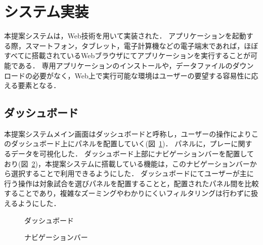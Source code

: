 \documentclass[sotsuron]{kuee}
\begin{document}
	\section{システム実装}
			本提案システムは，Web技術を用いて実装された．
			アプリケーションを起動する際，スマートフォン，タブレット，電子計算機などの電子端末であれば，ほぼすべてに搭載されているWebブラウザにてアプリケーションを実行することが可能である．
			専用アプリケーションのインストールや，データファイルのダウンロードの必要がなく，Web上で実行可能な環境はユーザーの要望する容易性に応える要素となる．
		\subsection{ダッシュボード}
			本提案システムメイン画面はダッシュボードと呼称し，ユーザーの操作によりこのダッシュボード上にパネルを配置していく(図~\ref{fig:dashboard})．
			パネルに，プレーに関するデータを可視化した．
			ダッシュボード上部にナビゲーションバーを配置しており(図~\ref{fig:nav})，本提案システムに搭載している機能は，このナビゲーションバーから選択することで利用できるようにした．
			ダッシュボードにてユーザーが主に行う操作は対象試合を選びパネルを配置することと，配置されたパネル間を比較することであり，複雑なズーミングやわかりにくいフィルタリングは行わずに扱えるようにした．
			\begin{figure}
				\begin{center}
				\end{center}
				\caption{ダッシュボード}
		  		\label{fig:dashboard}
			\end{figure}
			\begin{figure}
				\begin{center}
				\end{center}
				\caption{ナビゲーションバー}
		  		\label{fig:nav}
			\end{figure}
\end{document}
